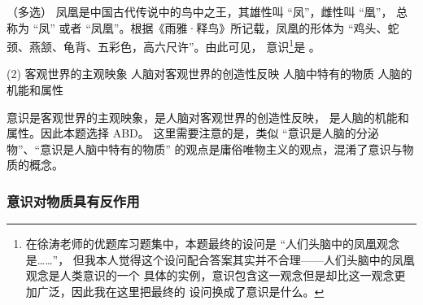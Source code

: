 \documentclass[11pt, UTF8]{book} %
\begin{document}
\begin{example}
    （多选）
    凤凰是中国古代传说中的鸟中之王，其雄性叫 “凤”，雌性叫 “凰”，
    总称为 “凤” 或者 “凤凰”。根据《雨雅·释鸟》所记载，凤凰的形体为
    “鸡头、蛇颈、燕颔、龟背、五彩色，高六尺许”。由此可见，
    意识\footnote{
        在徐涛老师的优题库习题集\cite{优题库}中，本题最终的设问是 “人们头脑中的凤凰观念是……”，
        但我本人觉得这个设问配合答案其实并不合理——人们头脑中的凤凰观念是人类意识的一个
        具体的实例，意识包含这一观念但是却比这一观念更加广泛，因此我在这里把最终的
        设问换成了意识是什么。
    }是 \underline{\qquad \qquad \qquad}。
    \begin{tasks}[label={\Alph*.}](2)
        \task 客观世界的主观映象
        \task 人脑对客观世界的创造性反映
        \task 人脑中特有的物质
        \task 人脑的机能和属性
    \end{tasks}
    \begin{cmt}
        意识是客观世界的主观映象，是人脑对客观世界的创造性反映，
        是人脑的机能和属性。因此本题选择 ABD。
        这里需要注意的是，类似 “意识是人脑的分泌物”、“意识是人脑中特有的物质”
        的观点是庸俗唯物主义的观点，混淆了意识与物质的概念。
    \end{cmt}
\end{example}

\subsubsection{意识对物质具有反作用}
\end{document}
